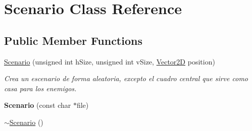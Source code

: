 \hypertarget{class_scenario}{\section{Scenario Class Reference}
\label{class_scenario}
}
\subsection*{Public Member Functions}
\begin{DoxyCompactItemize}
\item 
\hyperlink{class_scenario_a8189517ddf6e34f006df80cf8fb6a71f}{Scenario} (unsigned int h\-Size, unsigned int v\-Size, \hyperlink{class_vector2_d}{Vector2\-D} position)
\begin{DoxyCompactList}\small\item\em Crea un escenario de forma aleatoria, excepto el cuadro central que sirve como casa para los enemigos. \end{DoxyCompactList}\item 
\hypertarget{class_scenario_ad4e825abd3b69f660fe0eadf02496321}{{\bfseries Scenario} (const char $\ast$file)}\label{class_scenario_ad4e825abd3b69f660fe0eadf02496321}

\item 
\hypertarget{class_scenario_aa7e7548858cbc52614d46723c0333038}{\hyperlink{class_scenario_aa7e7548858cbc52614d46723c0333038}{$\sim$\-Scenario} ()}\label{class_scenario_aa7e7548858cbc52614d46723c0333038}


\end{DoxyCompactItemize}
